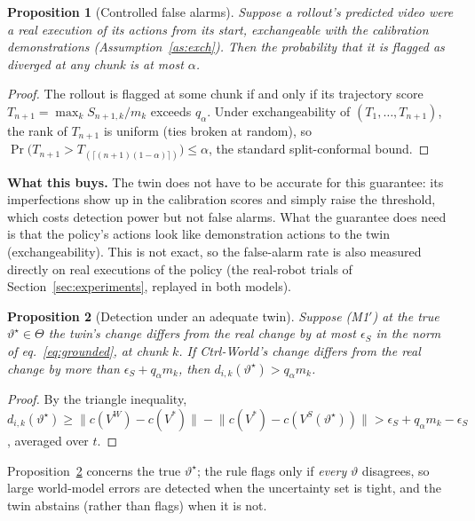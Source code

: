 \documentclass[11pt,a4paper]{article}
\theoremstyle{plain}
\newtheorem{proposition}{Proposition}
\theoremstyle{definition}
\theoremstyle{remark}
\newcommand{\VW}{V^{W}}
\newcommand{\VS}{V^{S}}
\begin{document}
\begin{proposition}[Controlled false alarms]\label{prop:conformal}
Suppose a rollout's predicted video were a real execution of its actions from its start, exchangeable with the calibration demonstrations (Assumption~\ref{as:exch}). Then the probability that it is flagged as diverged at \emph{any} chunk is at most $\alpha$.
\end{proposition}
\begin{proof}
The rollout is flagged at some chunk if and only if its trajectory score $T_{n+1}=\max_k S_{n+1,k}/m_k$ exceeds $q_\alpha$. Under exchangeability of $(T_1,\dots,T_{n+1})$, the rank of $T_{n+1}$ is uniform (ties broken at random), so $\Pr\big(T_{n+1}>T_{(\lceil(n+1)(1-\alpha)\rceil)}\big)\le\alpha$, the standard split-conformal bound.
\end{proof}
\begin{why}
\textbf{What this buys.} The twin does not have to be accurate for this guarantee: its imperfections show up in the calibration scores and simply raise the threshold, which costs detection power but not false alarms. What the guarantee does need is that the policy's actions look like demonstration actions to the twin (exchangeability). This is not exact, so the false-alarm rate is also measured directly on real executions of the policy (the real-robot trials of Section~\ref{sec:experiments}, replayed in both models).
\end{why}

\begin{proposition}[Detection under an adequate twin]\label{prop:detect}
Suppose (M1$'$) at the true $\vartheta^\star\in\Theta$ the twin's change differs from the real change by at most $\epsilon_S$ in the norm of eq.~\eqref{eq:grounded}, at chunk $k$. If Ctrl-World's change differs from the real change by more than $\epsilon_S+q_\alpha m_k$, then $d_{i,k}(\vartheta^\star)>q_\alpha m_k$.
\end{proposition}
\begin{proof}
By the triangle inequality, $d_{i,k}(\vartheta^\star)\ge\lVert c(\VW)-c(V^\ast)\rVert-\lVert c(V^\ast)-c(\VS(\vartheta^\star))\rVert>\epsilon_S+q_\alpha m_k-\epsilon_S$, averaged over $t$.
\end{proof}
Proposition~\ref{prop:detect} concerns the true $\vartheta^\star$; the rule flags only if \emph{every} $\vartheta$ disagrees, so large world-model errors are detected when the uncertainty set is tight, and the twin abstains (rather than flags) when it is not.
\end{document}
